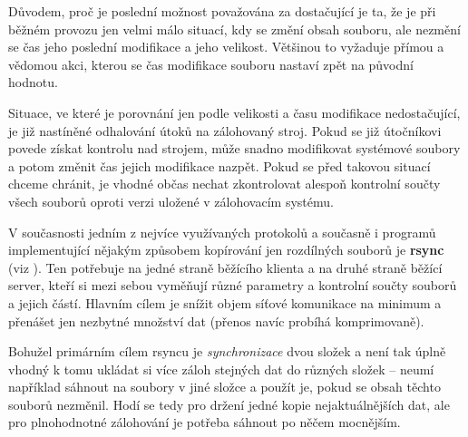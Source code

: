 Důvodem, proč je poslední možnost považována za dostačující je ta, že je při
běžném provozu jen velmi málo situací, kdy se změní obsah souboru, ale nezmění
se čas jeho poslední modifikace a jeho velikost. Většinou to vyžaduje přímou
a vědomou akci, kterou se čas modifikace souboru nastaví zpět na původní
hodnotu.

Situace, ve které je porovnání jen podle velikosti a času modifikace
nedostačující, je již nastíněné odhalování útoků na zálohovaný stroj. Pokud se
již útočníkovi povede získat kontrolu nad strojem, může snadno modifikovat
systémové soubory a potom změnit čas jejich modifikace nazpět. Pokud se před
takovou situací chceme chránit, je vhodné občas nechat zkontrolovat alespoň
kontrolní součty všech souborů oproti verzi uložené v zálohovacím systému.

V současnosti jedním z nejvíce využívaných protokolů a současně i programů
implementující nějakým způsobem kopírování jen rozdílných souborů je {\bf rsync}
(viz \cite{rsync}). Ten potřebuje na jedné straně běžícího klienta a na druhé
straně běžící server, kteří si mezi sebou vyměňují různé parametry a kontrolní
součty souborů a jejich částí. Hlavním cílem je snížit objem síťové komunikace
na minimum a přenášet jen nezbytné množství dat (přenos navíc probíhá
komprimovaně).

Bohužel primárním cílem rsyncu je {\it synchronizace} dvou složek a není tak
úplně vhodný k tomu ukládat si více záloh stejných dat do různých složek --
neumí například sáhnout na soubory v jiné složce a použít je, pokud se obsah
těchto souborů nezměnil. Hodí se tedy pro držení jedné kopie nejaktuálnějších
dat, ale pro plnohodnotné zálohování je potřeba sáhnout po něčem mocnějším.
